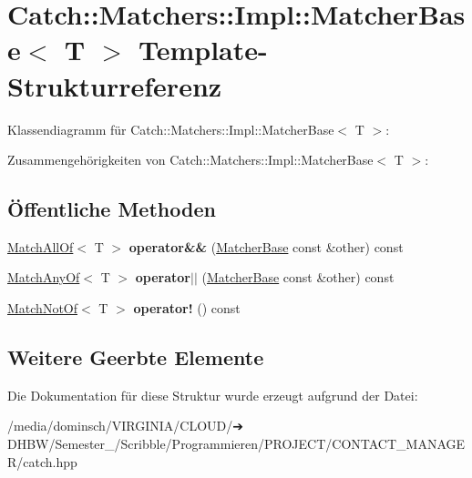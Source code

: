\hypertarget{structCatch_1_1Matchers_1_1Impl_1_1MatcherBase}{}\section{Catch\+:\+:Matchers\+:\+:Impl\+:\+:Matcher\+Base$<$ T $>$ Template-\/\+Strukturreferenz}
\label{structCatch_1_1Matchers_1_1Impl_1_1MatcherBase}


Klassendiagramm für Catch\+:\+:Matchers\+:\+:Impl\+:\+:Matcher\+Base$<$ T $>$\+:


Zusammengehörigkeiten von Catch\+:\+:Matchers\+:\+:Impl\+:\+:Matcher\+Base$<$ T $>$\+:
\subsection*{Öffentliche Methoden}
\begin{DoxyCompactItemize}
\item 
\mbox{\label{structCatch_1_1Matchers_1_1Impl_1_1MatcherBase_a23c336f6d9457735ddc8dc7ea864d7c9}} 
\hyperlink{structCatch_1_1Matchers_1_1Impl_1_1MatchAllOf}{Match\+All\+Of}$<$ T $>$ {\bfseries operator\&\&} (\hyperlink{structCatch_1_1Matchers_1_1Impl_1_1MatcherBase}{Matcher\+Base} const \&other) const
\item 
\mbox{\label{structCatch_1_1Matchers_1_1Impl_1_1MatcherBase_a5f8542b8f1567a6f9c65d0a6da7b679b}} 
\hyperlink{structCatch_1_1Matchers_1_1Impl_1_1MatchAnyOf}{Match\+Any\+Of}$<$ T $>$ {\bfseries operator$\vert$$\vert$} (\hyperlink{structCatch_1_1Matchers_1_1Impl_1_1MatcherBase}{Matcher\+Base} const \&other) const
\item 
\mbox{\label{structCatch_1_1Matchers_1_1Impl_1_1MatcherBase_a5bb94bf2ff5c7ef73b7c11eb173bdf3b}} 
\hyperlink{structCatch_1_1Matchers_1_1Impl_1_1MatchNotOf}{Match\+Not\+Of}$<$ T $>$ {\bfseries operator!} () const
\end{DoxyCompactItemize}
\subsection*{Weitere Geerbte Elemente}


Die Dokumentation für diese Struktur wurde erzeugt aufgrund der Datei\+:\begin{DoxyCompactItemize}
\item 
/media/dominsch/\+V\+I\+R\+G\+I\+N\+I\+A/\+C\+L\+O\+U\+D/➔ D\+H\+B\+W/\+Semester\+\_/\+Scribble/\+Programmieren/\+P\+R\+O\+J\+E\+C\+T/\+C\+O\+N\+T\+A\+C\+T\+\_\+\+M\+A\+N\+A\+G\+E\+R/catch.\+hpp\end{DoxyCompactItemize}
